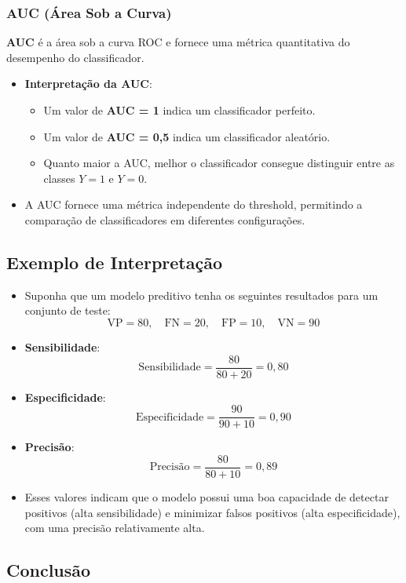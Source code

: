 \documentclass{sciposter}
\begin{document}
\begin{multicols}{3}
\subsubsection{AUC (Área Sob a Curva)}

\textbf{AUC} é a área sob a curva ROC e fornece uma métrica quantitativa do desempenho do classificador.

\begin{itemize}
    \item \textbf{Interpretação da AUC}:
    \begin{itemize}
        \item Um valor de \textbf{AUC = 1} indica um classificador perfeito.
        \item Um valor de \textbf{AUC = 0{,}5} indica um classificador aleatório.
        \item Quanto maior a AUC, melhor o classificador consegue distinguir entre as classes $Y=1$ e $Y=0$.
    \end{itemize}
    \item A AUC fornece uma métrica independente do threshold, permitindo a comparação de classificadores em diferentes configurações.
\end{itemize}

\subsection{Exemplo de Interpretação}

\begin{itemize}
    \item Suponha que um modelo preditivo tenha os seguintes resultados para um conjunto de teste:
    \[
    \text{VP} = 80, \quad \text{FN} = 20, \quad \text{FP} = 10, \quad \text{VN} = 90
    \]
    \item \textbf{Sensibilidade}:
    \[
    \text{Sensibilidade} = \frac{80}{80 + 20} = 0{,}80
    \]
    \item \textbf{Especificidade}:
    \[
    \text{Especificidade} = \frac{90}{90 + 10} = 0{,}90
    \]
    \item \textbf{Precisão}:
    \[
    \text{Precisão} = \frac{80}{80 + 10} = 0{,}89
    \]
    \item Esses valores indicam que o modelo possui uma boa capacidade de detectar positivos (alta sensibilidade) e minimizar falsos positivos (alta especificidade), com uma precisão relativamente alta.
\end{itemize}

\subsection{Conclusão}


\end{multicols}
\end{document}
